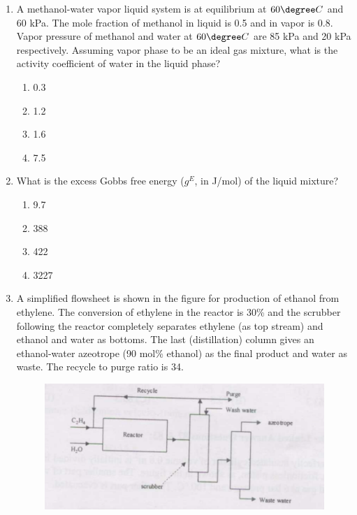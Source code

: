\documentclass[journal,12pt,onecolumn]{IEEEtran}
\theoremstyle{remark}
\begin{document}
\begin{enumerate}
    \item A methanol-water vapor liquid system is at equilibrium at $60\degree C$ and 60 kPa. The mole fraction of methanol in liquid is 0.5 and in vapor is 0.8. Vapor pressure of methanol and water at $60\degree C$ are 85 kPa and 20 kPa respectively. Assuming vapor phase to be an ideal gas mixture, what is the activity coefficient of water in the liquid phase?

\begin{multicols}{2}
    \begin{enumerate}
        \item 0.3
        \item 1.2
        \item 1.6
        \item 7.5
    \end{enumerate}
\end{multicols}

    \item What is the excess Gobbs free energy ($g^E$, in J/mol) of the liquid mixture?

    \begin{multicols}{2}
        \begin{enumerate}
            \item 9.7
            \item 388
            \item 422
            \item 3227
        \end{enumerate}
    \end{multicols}

    \item A simplified flowsheet is shown in the figure for production of ethanol from ethylene. The conversion of ethylene in the reactor is 30\% and the scrubber following the reactor completely separates ethylene (as top stream) and ethanol and water as bottoms. The last (distillation) column gives an ethanol-water azeotrope (90 mol\% ethanol) as the final product and water as waste. The recycle to purge ratio is 34.

\begin{figure}[H]
    \centering
    \includegraphics[width=0.5\columnwidth]{figs/78.png}
    \caption{}
    \label{fig:78}
\end{figure}


\end{enumerate}
\end{document}
